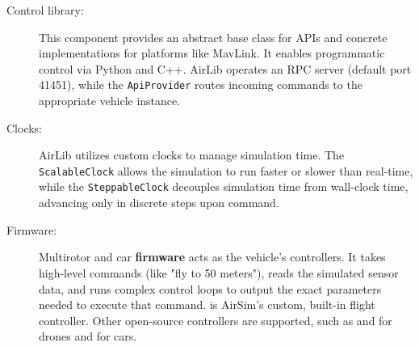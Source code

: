 \begin{description}
    \item[Control library:] This component provides an abstract base class for APIs and concrete implementations for platforms like MavLink. It enables programmatic control via Python and C++. AirLib operates an RPC server (default port 41451), while the \texttt{ApiProvider} routes incoming commands to the appropriate vehicle instance.
    \item[Clocks:] AirLib utilizes custom clocks to manage simulation time. The \texttt{ScalableClock} allows the simulation to run faster or slower than real-time, while the \texttt{SteppableClock} decouples simulation time from wall-clock time, advancing only in discrete steps upon command.
    \item[Firmware:] Multirotor and car \textbf{firmware} acts as the vehicle's controllers. It takes high-level commands (like "fly to 50 meters"), reads the simulated sensor data, and runs complex control loops to output the exact parameters needed to execute that command.
          \texttt{} is AirSim's custom, built-in flight controller. Other open-source controllers are supported, such as \texttt{} and \texttt{} for drones and \texttt{} for cars.
\end{description}

